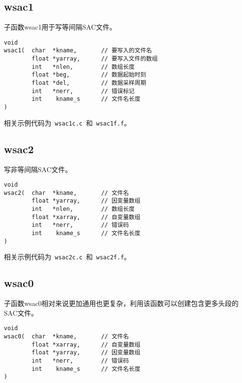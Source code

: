 \subsection{wsac1}
子函数wsac1用于写等间隔SAC文件。
\begin{lstlisting}[style=C]
void                                        
wsac1(  char  *kname,       // 要写入的文件名                                                       
        float *yarray,      // 要写入文件的数组                        
        int   *nlen,        // 数组长度                                     
        float *beg,         // 数据起始时刻                                           
        float *del,         // 数据采样周期                                        
        int   *nerr,        // 错误标记                                        
        int    kname_s      // 文件名长度
)
\end{lstlisting}

相关示例代码为~\lstinline{wsac1c.c}~和~\lstinline{wsac1f.f}。

\subsection{wsac2}
写非等间隔SAC文件。

\begin{lstlisting}[style=C]
void                    
wsac2(  char  *kname,       // 文件名
        float *yarray,      // 因变量数组                                                   
        int   *nlen,        // 数组长度                                             
        float *xarray,      // 自变量数组                                               
        int   *nerr,        // 错误码                                             
        int    kname_s      // 文件名长度
)
\end{lstlisting}

相关示例代码为~\lstinline{wsac2c.c}~和~\lstinline{wsac2f.f}。

\subsection{wsac0}
子函数wsac0相对来说更加通用也更复杂，利用该函数可以创建包含更多头段的SAC文件。

\begin{lstlisting}[style=C]
void                                                                                
wsac0(  char  *kname,       // 文件名
        float *xarray,      // 自变量数组                                                 
        float *yarray,      // 因变量数组                                             
        int   *nerr,        // 错误码                                             
        int    kname_s      // 文件名长度
)
\end{lstlisting}

